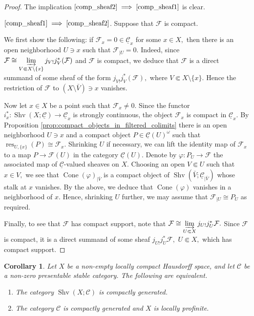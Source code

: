 \documentclass[11pt,leqno]{amsart}
\newcommand{\Implies}[2]{$\text{\ref{#1}}\implies\text{\ref{#2}}$}
\newtheorem{cor}[theo]{Corollary}
\numberwithin{equation}{section}
\newcommand{\indlim}[1][]{\mathop{\varinjlim}\limits_{#1}}
\newcommand{\Cone}{\operatorname{Cone}}
\newcommand{\cF}{{\mathcal F}}
\newcommand{\cC}{{\mathcal C}}
\newcommand{\un}{\underline}
\newcommand{\Sh}{\operatorname{Shv}}
\newcommand{\res}{\operatorname{res}}
\begin{document}
\begin{proof}The implication \Implies{comp_sheaf2}{comp_sheaf1} is clear. 

\Implies{comp_sheaf1}{comp_sheaf2}. Suppose that $\cF$ is compact. 

We first show the following: if $\cF_x=0\in\un{\cC}_x$ for some $x\in X,$ then there is an open neighborhood $U\ni x$ such that $\cF_{\mid U}=0.$ Indeed, since $\cF\cong\indlim[V\Subset X\setminus \{x\}]j_{V!}j_V^*(\cF)$ and $\cF$ is compact, we deduce that $\cF$ is a direct summand of some sheaf of the form $j_{V!}j_V^*(\cF),$ where $V\Subset X\setminus \{x\}.$ Hence the restriction of $\cF$ to $(X\setminus\bar{V})\ni x$ vanishes.

Now let $x\in X$ be a point such that $\cF_x\ne 0.$ Since the functor $i_x^*:\Sh(X;\un{\cC})\to\un{\cC}_x$ is strongly continuous, the object $\cF_x$ is compact in $\un{\cC}_x.$ By Proposition \ref{prop:compact_objects_in_filtered_colimits} there is an open neighborhood $U\ni x$ and a compact object $P\in\un{\cC}(U)^{\omega}$ such that $\res_{U,\{x\}}(P)\cong \cF_x.$ Shrinking $U$ if necessary, we can lift the identity map of $\cF_x$ to a map $P\to\cF(U)$ in the category $\un{\cC}(U).$ Denote by $\varphi:P_U\to\cF$ the associated map of $\un{\cC}$-valued sheaves on $X.$ Choosing an open $V\Subset U$ such that $x\in V,$ we see that $\Cone(\varphi)_{\mid \bar{V}}$ is a compact object of $\Sh(\bar{V};\un{\cC}_{\mid\bar{V}})$ whose stalk at $x$ vanishes. By the above, we deduce that $\Cone(\varphi)$ vanishes in a neighborhood of $x.$ Hence, shrinking $U$ further, we may assume that $\cF_{\mid U}\cong P_U$ as required.

Finally, to see that $\cF$ has compact support, note that $\cF\cong\indlim[U\Subset X]j_{U!}j_U^*\cF.$ Since $\cF$ is compact, it is a direct summand of some sheaf $j_{U!}j_U^*\cF,$ $U\Subset X,$ which has compact support.
\end{proof}

\begin{cor}\label{cor:when_sheaves_comp_gen} Let $X$ be a non-empty locally compact Hausdorff space, and let $\cC$ be a non-zero presentable stable category. The following are equivalent.

\begin{enumerate}[label=(\roman*),ref=(\roman*)]
\item The category $\Sh(X;\cC)$ is compactly generated. \label{comp_gen1}

\item The category $\cC$ is compactly generated and $X$ is locally profinite. \label{comp_gen2}
\end{enumerate}
\end{cor}
\end{document}
